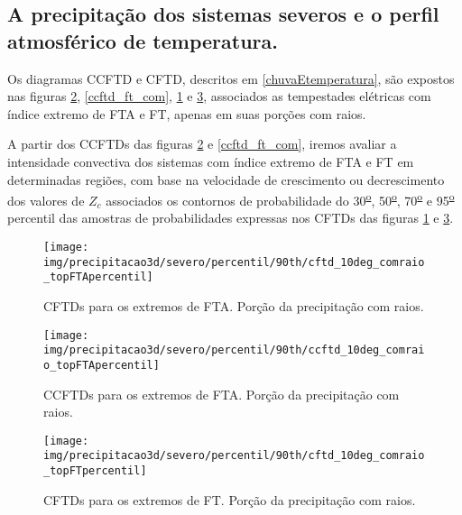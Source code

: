 \subsection{A precipitação dos sistemas severos e o perfil atmosférico de temperatura.}

Os diagramas CCFTD e CFTD, descritos em \ref{chuvaEtemperatura}, são expostos nas figuras \ref{ccftd_fta_com}, \ref{ccftd_ft_com}, \ref{cftd_fta_com} e \ref{cftd_ft_com}, associados as tempestades elétricas com índice extremo de FTA e FT, apenas em suas porções com raios.

A partir dos CCFTDs das figuras \ref{ccftd_fta_com} e \ref{ccftd_ft_com}, iremos avaliar a intensidade convectiva dos sistemas com índice extremo de FTA e FT em determinadas regiões, com base na velocidade de crescimento ou decrescimento dos valores de $Z_{c}$ associados os contornos de probabilidade do 30\textsuperscript{\underline{o}}, 50\textsuperscript{\underline{o}}, 70\textsuperscript{\underline{o}} e 95\textsuperscript{\underline{o}} percentil das amostras de probabilidades expressas nos CFTDs das figuras \ref{cftd_fta_com} e \ref{cftd_ft_com}.	

\begin{figure}
  \centering
  \texttt{[image: img/precipitacao3d/severo/percentil/90th/cftd\_10deg\_comraio\_topFTApercentil]}
 \caption{CFTDs para os extremos de FTA. Porção da precipitação com raios.}
 \label{cftd_fta_com}
\end{figure} 

\begin{figure}
  \centering
  \texttt{[image: img/precipitacao3d/severo/percentil/90th/ccftd\_10deg\_comraio\_topFTApercentil]}
  \caption{CCFTDs para os extremos de FTA. Porção da precipitação com raios.}
  \label{ccftd_fta_com}   
\end{figure} 

 
\begin{figure}
  \texttt{[image: img/precipitacao3d/severo/percentil/90th/cftd\_10deg\_comraio\_topFTpercentil]}
 \caption{CFTDs para os extremos de FT. Porção da precipitação com raios.}
 \label{cftd_ft_com}
\end{figure} 

